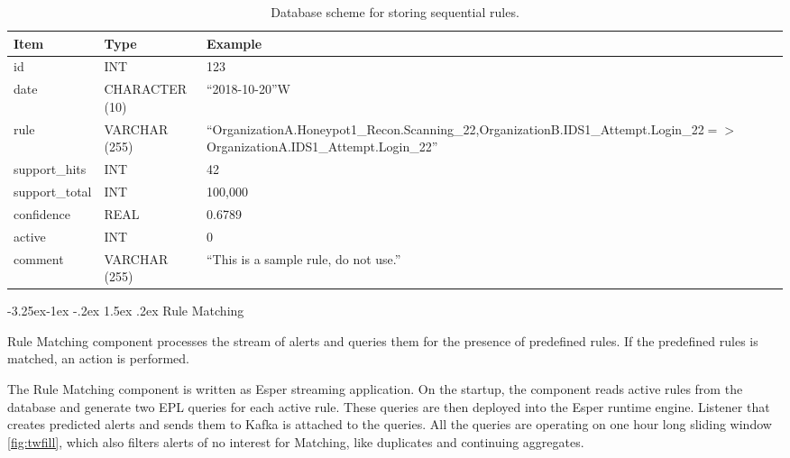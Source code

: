 \documentclass[a4paper]{article} %
\makeatletter
\renewcommand\subsection{\@startsection{subsection}{2}{\z@}%
                   {-3.25ex\@plus -1ex \@minus -.2ex}%
                   {1.5ex \@plus .2ex}%
                   {\normalfont\sffamily\large\bfseries\color{projectcolor}}}
\makeatother
\begin{document}
\begin{table}[h]
\centering
\caption{Database scheme for storing sequential rules.}
\label{tab:aida_db}
\begin{tabular}{| l | l | m{9cm} |}
\hline
\rowcolor{gray!15}\textbf{Item} & \textbf{Type} & \textbf{Example} \\
\hline \hline
id             & INT            & 123        \\ \hline
date           & CHARACTER (10) & ``2018-10-20''W \\ \hline
rule           & VARCHAR (255)  & ``OrganizationA.Honeypot1\_Recon.Scanning\_22,\newline OrganizationB.IDS1\_Attempt.Login\_22\newline $=>$ OrganizationA.IDS1\_Attempt.Login\_22'' \\ \hline
support\_hits  & INT            & 42      \\ \hline
support\_total & INT            & 100,000 \\ \hline
confidence     & REAL           & 0.6789  \\ \hline
active         & INT            & 0       \\ \hline
comment        & VARCHAR (255)  & ``This is a sample rule, do not use.'' \\ \hline
\end{tabular}
\end{table}


\subsection{Rule Matching}

Rule Matching component processes the stream of alerts and queries them for the presence of predefined rules. If the predefined rules is matched, an action is performed.

The Rule Matching component is written as Esper streaming application. On the startup, the component reads active rules from the database and generate two EPL queries for each active rule. These queries are then deployed into the Esper runtime engine. Listener that creates predicted alerts and sends them to Kafka is attached to the queries. All the queries are operating on one hour long sliding window \autoref{fig:twfill}, which also filters alerts of no interest for Matching, like duplicates and continuing aggregates.
\end{document}
